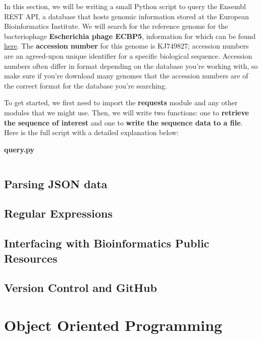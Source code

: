 \documentclass[a4paper,11pt]{article}
\begin{document}
In this section, we will be writing a small Python script to query the Ensembl REST API, a 
database that hosts genomic information stored at the European Bioinformatics Institute.  We 
will search for the reference genome for the bacteriophage \textbf{Escherichia phage ECBP5}, 
information for which can be found \href{https://www.ebi.ac.uk/ena/data/view/KJ749827}{here}.  
The \textbf{accession number} for this genome is KJ749827; accession numbers are an agreed-upon 
unique identifier for a specific biological sequence.  Accession numbers often differ in format 
depending on the database you're working with, so make sure if you're download many genomes that 
the accession numbers are of the correct format for the database you're searching.  \par

To get started, we first need to import the \textbf{requests} module and any other modules that 
we might use.  Then, we will write two functions: one to \textbf{retrieve the sequence of interest} and 
one to \textbf{write the sequence data to a file}.  Here is the full script with a detailed 
explanation below:

\pagebreak
\textbf{query.py}
\vspace{3mm}
\begin{lstlisting}

\end{lstlisting}
\vspace{3mm}

\pagebreak
\subsection{Parsing JSON data}

\pagebreak
\subsection{Regular Expressions}

\pagebreak
\subsection{Interfacing with Bioinformatics Public Resources}

\pagebreak
\subsection{Version Control and GitHub}

\pagebreak
\section{Object Oriented Programming}
\end{document}

